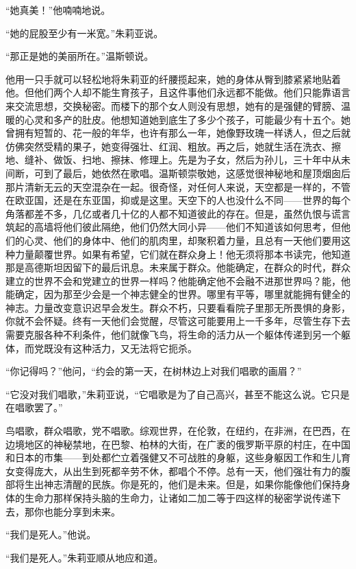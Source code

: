 ``她真美！''他喃喃地说。

``她的屁股至少有一米宽。''朱莉亚说。

``那正是她的美丽所在。''温斯顿说。

他用一只手就可以轻松地将朱莉亚的纤腰揽起来，她的身体从臀到膝紧紧地贴着他。但他们两个人却不能生育孩子，且这件事他们永远都不能做。他们只能靠语言来交流思想，交换秘密。而楼下的那个女人则没有思想，她有的是强健的臂膀、温暖的心灵和多产的肚皮。他想知道她到底生了多少个孩子，可能最少有十五个。她曾拥有短暂的、花一般的年华，也许有那么一年，她像野玫瑰一样诱人，但之后就仿佛突然受精的果子，她变得强壮、红润、粗放。再之后，她就生活在洗衣、擦地、缝补、做饭、扫地、擦抹、修理上。先是为子女，然后为孙儿，三十年中从未间断，可到了最后，她依然在歌唱。温斯顿崇敬她，这感觉很神秘地和屋顶烟囱后那片清新无云的天空混杂在一起。很奇怪，对任何人来说，天空都是一样的，不管在欧亚国，还是在东亚国，抑或是这里。天空下的人也没什么不同——世界的每个角落都差不多，几亿或者几十亿的人都不知道彼此的存在。但是，虽然仇恨与谎言筑起的高墙将他们彼此隔绝，他们仍然大同小异——他们不知道该如何思考，但他们的心灵、他们的身体中、他们的肌肉里，却聚积着力量，且总有一天他们要用这种力量颠覆世界。如果有希望，它们就在群众身上！他无须将那本书读完，他知道那是高德斯坦因留下的最后讯息。未来属于群众。他能确定，在群众的时代，群众建立的世界不会和党建立的世界一样吗？他能确定他不会融不进那世界吗？能，他能确定，因为那至少会是一个神志健全的世界。哪里有平等，哪里就能拥有健全的神志。力量改变意识迟早会发生。群众不朽，只要看看院子里那无所畏惧的身影，你就不会怀疑。终有一天他们会觉醒，尽管这可能要用上一千多年，尽管生存下去需要克服各种不利条件，他们就像飞鸟，将生命的活力从一个躯体传递到另一个躯体，而党既没有这种活力，又无法将它扼杀。

``你记得吗？''他问，``约会的第一天，在树林边上对我们唱歌的画眉？''

``它没对我们唱歌，''朱莉亚说，``它唱歌是为了自己高兴，甚至不能这么说。它只是在唱歌罢了。''

鸟唱歌，群众唱歌，党不唱歌。综观世界，在伦敦，在纽约，在非洲，在巴西，在边境地区的神秘禁地，在巴黎、柏林的大街，在广袤的俄罗斯平原的村庄，在中国和日本的市集——到处都伫立着强健又不可战胜的身躯，这些身躯因工作和生儿育女变得庞大，从出生到死都辛劳不休，都唱个不停。总有一天，他们强壮有力的腹部将生出神志清醒的民族。你是死的，他们是未来。但是，如果你能像他们保持身体的生命力那样保持头脑的生命力，让诸如二加二等于四这样的秘密学说传递下去，那你也能分享到未来。

``我们是死人。''他说。

``我们是死人。''朱莉亚顺从地应和道。

